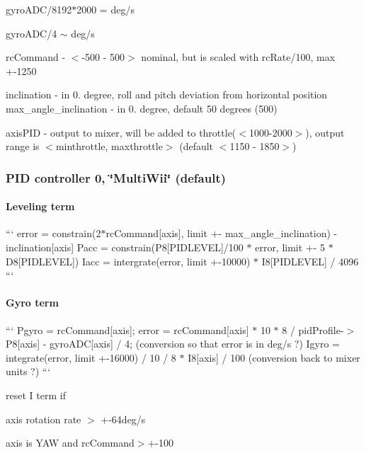 {\ttfamily gyro\+A\+D\+C/8192$\ast$2000 = deg/s}

{\ttfamily gyro\+A\+D\+C/4 $\sim$ deg/s}

{\ttfamily rc\+Command} -\/ {\ttfamily $<$-\/500 -\/ 500$>$} nominal, but is scaled with {\ttfamily rc\+Rate/100}, max +-\/1250

{\ttfamily inclination} -\/ in 0. degree, roll and pitch deviation from horizontal position {\ttfamily max\+\_\+angle\+\_\+inclination} -\/ in 0. degree, default 50 degrees (500)

{\ttfamily axis\+P\+I\+D} -\/ output to mixer, will be added to throttle({\ttfamily $<$1000-\/2000$>$}), output range is {\ttfamily $<$minthrottle, maxthrottle$>$} (default {\ttfamily $<$1150 -\/ 1850$>$})

\subsubsection*{P\+I\+D controller 0, \char`\"{}\+Multi\+Wii\char`\"{} (default)}

\paragraph*{Leveling term}

``` error = constrain(2$\ast$rc\+Command\mbox{[}axis\mbox{]}, limit +-\/ max\+\_\+angle\+\_\+inclination) -\/ inclination\mbox{[}axis\mbox{]} Pacc = constrain(P8\mbox{[}P\+I\+D\+L\+E\+V\+E\+L\mbox{]}/100 $\ast$ error, limit +-\/ 5 $\ast$ D8\mbox{[}P\+I\+D\+L\+E\+V\+E\+L\mbox{]}) Iacc = intergrate(error, limit +-\/10000) $\ast$ I8\mbox{[}P\+I\+D\+L\+E\+V\+E\+L\mbox{]} / 4096 ``` \paragraph*{Gyro term}

``` Pgyro = rc\+Command\mbox{[}axis\mbox{]}; error = rc\+Command\mbox{[}axis\mbox{]} $\ast$ 10 $\ast$ 8 / pid\+Profile-\/$>$P8\mbox{[}axis\mbox{]} -\/ gyro\+A\+D\+C\mbox{[}axis\mbox{]} / 4; (conversion so that error is in deg/s ?) Igyro = integrate(error, limit +-\/16000) / 10 / 8 $\ast$ I8\mbox{[}axis\mbox{]} / 100 (conversion back to mixer units ?) ```

reset I term if
\begin{DoxyItemize}
\item axis rotation rate $>$ +-\/64deg/s
\item axis is Y\+A\+W and rc\+Command$>$+-\/100
\end{DoxyItemize}


